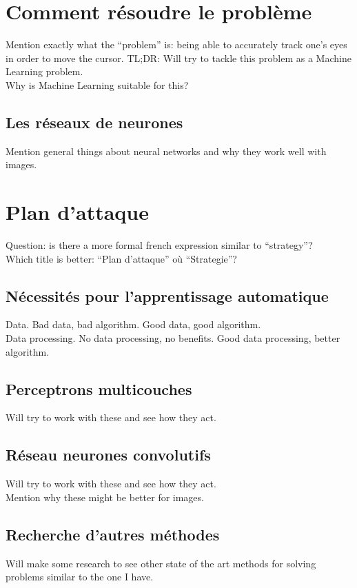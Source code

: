 \section{Comment résoudre le problème}
Mention exactly what the ``problem'' is: being able to accurately track one's eyes in order to move the cursor.
TL;DR: Will try to tackle this problem as a Machine Learning problem.\\
Why is Machine Learning suitable for this?\\
\subsection{Les réseaux de neurones}
Mention general things about neural networks and why they work well with images.\\

\section{Plan d'attaque}
Question: is there a more formal french expression similar to ``strategy''?\\
Which title is better: ``Plan d'attaque'' où ``Strategie''?
\subsection{Nécessités pour l'apprentissage automatique}
Data. Bad data, bad algorithm. Good data, good algorithm.\\

Data processing. No data processing, no benefits. Good data processing, better algorithm.\\

\subsection{Perceptrons multicouches}
Will try to work with these and see how they act.\\

\subsection{Réseau neurones convolutifs}
Will try to work with these and see how they act.\\
Mention why these might be better for images.\\

\subsection{Recherche d'autres méthodes}
Will make some research to see other state of the art methods for solving problems similar to the one I have.\\